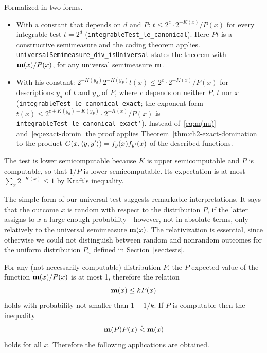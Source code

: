 \begin{formalization}
Formalized in two forms.
\begin{itemize}
\item With a constant that depends on \( d \) and \( P \): \( t \le 2^{c} \cdot 2^{-K(x)}/P(x) \)
  for every integrable test \( t = 2^{d} \) (\texttt{integrableTest\_le\_canonical}). Here
  \( P t \) is a constructive semimeasure and the coding theorem applies.
  \texttt{universalSemimeasure\_div\_isUniversal} states the theorem with \( \mathbf{m}(x)/P(x) \), for
  any universal semimeasure \( \mathbf{m} \).
\item With his constant: \( 2^{-K(y_{d})} 2^{-K(y_{P})} t(x) \le 2^{c} \cdot 2^{-K(x)}/P(x) \)
  for descriptions \( y_{d} \) of \( t \) and \( y_{P} \) of \( P \), where \( c \) depends on
  neither \( P \), \( t \) nor \( x \) (\texttt{integrableTest\_le\_canonical\_exact}; the
  exponent form \( t(x) \le 2^{c + K(y_{d}) + K(y_{P})} \cdot 2^{-K(x)}/P(x) \) is
  \texttt{integrableTest\_le\_canonical\_exact'}). Instead of~\eqref{eq:m(nu)}
  and~\eqref{eq:exact-domin} the proof applies Theorem~\ref{thm:ch2-exact-domination} to the
  product \( G(x, {\mathopen\langle y,y'\mathclose\rangle}) = f_{y}(x) f_{y'}(x) \) of the described functions.
\end{itemize}
The test is lower semicomputable because \( K \) is upper semicomputable and \( P \) is
computable, so that \( 1/P \) is lower semicomputable. Its expectation is at most
\( \sum_{x} 2^{-K(x)} \le 1 \) by Kraft's inequality.
\end{formalization}

The simple form of our universal test suggests remarkable interpretations.
It says that the outcome $x$ is random with respect to the distribution
$P$, if the latter assigns to $x$ a large enough
probability---however, not in absolute terms, only relatively to the
universal semimeasure $\mathbf{m}(x)$.
The relativization is essential, since
otherwise we could not distinguish between random and nonrandom
outcomes for the uniform distribution $P_{n}$ defined in
Section~\ref{sec:tests}.

For any (not necessarily computable) distribution $P$, the
$P$-expected value of the function $\mathbf{m}(x)/P(x)$ is at most 1,
therefore the relation
 \[
 	\mathbf{m}(x) \le k P(x)
 \]
  holds with probability not smaller than $1-1/k$.
If $P$ is computable then the inequality
 \[
	\mathbf{m}(P) P(x) \stackrel{{}_*}{<} \mathbf{m}(x)
 \]
  holds for all $x$.
Therefore the following applications are obtained.

